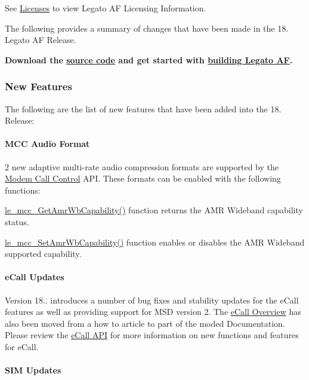 See \hyperlink{aboutLicenses}{Licenses} to view Legato AF Licensing Information.

The following provides a summary of changes that have been made in the 18. Legato AF Release.

{\bfseries  Download the \hyperlink{aboutReleaseInfo}{source code} and get started with \hyperlink{basicBuild}{building Legato AF}. }\hypertarget{releaseNotes18030_rn1803_Features}{}\subsubsection{New Features}\label{releaseNotes18030_rn1803_Features}
The following are the list of new features that have been added into the 18. Release\+:\hypertarget{releaseNotes18030_rn1803_Features_Audio}{}\paragraph{M\+C\+C Audio Format}\label{releaseNotes18030_rn1803_Features_Audio}
2 new adaptive multi-\/rate audio compression formats are supported by the \hyperlink{c_mcc}{Modem Call Control} A\+PI. These formats can be enabled with the following functions\+:
\begin{DoxyItemize}
\item \hyperlink{le__mcc__interface_8h_a3762311b9860dc66c52b00f4324dc140}{le\+\_\+mcc\+\_\+\+Get\+Amr\+Wb\+Capability()} function returns the A\+MR Wideband capability status.
\item \hyperlink{le__mcc__interface_8h_ab2df0040963d964f360cb2b7148f9277}{le\+\_\+mcc\+\_\+\+Set\+Amr\+Wb\+Capability()} function enables or disables the A\+MR Wideband supported capability.
\end{DoxyItemize}\hypertarget{releaseNotes18030_rn1803_Features_eCall}{}\paragraph{e\+Call Updates}\label{releaseNotes18030_rn1803_Features_eCall}
Version 18.. introduces a number of bug fixes and stability updates for the e\+Call features as well as providing support for M\+SD version 2. The \hyperlink{legatoServicesModemECall}{e\+Call Overview} has also been moved from a how to article to part of the moded Documentation. Please review the \hyperlink{c_ecall}{e\+Call A\+PI} for more information on new functions and features for e\+Call.\hypertarget{releaseNotes18030_rn1803_Features_SIM}{}\paragraph{S\+I\+M Updates}\label{releaseNotes18030_rn1803_Features_SIM}
